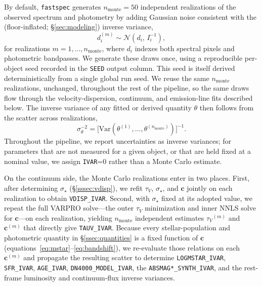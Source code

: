 \documentclass[modern,linenumbers]{aastex701}
\newcommand{\fastspec}{\texttt{fastspec}}
\newcommand{\vdisp}{\ensuremath{\sigma_\star}}
\newcommand{\tauv}{\ensuremath{\tau_V}}
\begin{document}
By default, \fastspec{} generates $n_\mathrm{monte}=50$ independent
realizations of the observed spectrum and photometry by adding
Gaussian noise consistent with the (floor-inflated;
\S\ref{sec:modeling}) inverse variance,
\begin{equation}
  d_i^{(m)} \sim \mathcal{N}\left(d_i,\,I_i^{-1}\right),
  \label{eq:mc_draw}
\end{equation}
for realizations $m=1,\ldots,n_\mathrm{monte}$, where $d_i$ indexes
both spectral pixels and photometric bandpasses. We generate these
draws once, using a reproducible per-object seed recorded in the
\texttt{SEED} output column. This seed is itself derived
deterministically from a single global run seed. We reuse the same
$n_\mathrm{monte}$ realizations, unchanged, throughout the rest of the
pipeline, so the same draws flow through the velocity-dispersion,
continuum, and emission-line fits described below. The inverse
variance of any fitted or derived quantity $\theta$ then follows from
the scatter across realizations,
\begin{equation}
  \sigma_\theta^{-2}
  = \bigl[\mathrm{Var}(\theta^{(1)},\ldots,\theta^{(n_\mathrm{monte})})\bigr]^{-1}.
  \label{eq:mc_unc}
\end{equation}
Throughout the pipeline, we report uncertainties as inverse variances;
for parameters that are not measured for a given object, or that are
held fixed at a nominal value, we assign \texttt{IVAR}=0 rather than a
Monte Carlo estimate.

On the continuum side, the Monte Carlo realizations enter in two
places. First, after determining \vdisp{} (\S\ref{sssec:vdisp}), we
refit \tauv, \vdisp, and $\mathbf{c}$ jointly on each realization to
obtain \texttt{VDISP\_IVAR}. Second, with \vdisp{} fixed at its
adopted value, we repeat the full VARPRO solve---the outer \tauv{}
minimization and inner NNLS solve for $\mathbf{c}$---on each
realization, yielding $n_\mathrm{monte}$ independent estimates
$\tauv^{(m)}$ and $\mathbf{c}^{(m)}$ that directly give
\texttt{TAUV\_IVAR}. Because every stellar-population and photometric
quantity in \S\ref{ssec:quantities} is a fixed function of
$\mathbf{c}$ (equations~\ref{eq:mstar}--\ref{eq:bandshift}), we
re-evaluate those relations on each $\mathbf{c}^{(m)}$ and propagate
the resulting scatter to determine \texttt{LOGMSTAR\_IVAR},
\texttt{SFR\_IVAR}, \texttt{AGE\_IVAR}, \texttt{DN4000\_MODEL\_IVAR},
the \texttt{ABSMAG*\_SYNTH\_IVAR}, and the rest-frame luminosity and
continuum-flux inverse variances.
\end{document}
